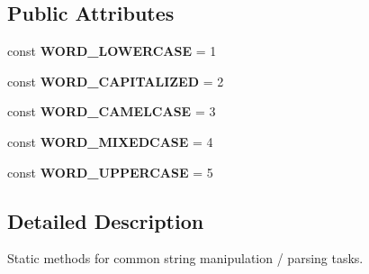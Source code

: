 \subsection*{Public Attributes}
\begin{DoxyCompactItemize}
\item 
\hypertarget{classBabab_1_1Simphplist_1_1String_ac9a5b0f0ab6669f348d8fd4b7872d886}{const {\bfseries W\+O\+R\+D\+\_\+\+L\+O\+W\+E\+R\+C\+A\+S\+E} = 1}\label{classBabab_1_1Simphplist_1_1String_ac9a5b0f0ab6669f348d8fd4b7872d886}

\item 
\hypertarget{classBabab_1_1Simphplist_1_1String_a50cb0d79ad7c99ee26a5671a8c8d5155}{const {\bfseries W\+O\+R\+D\+\_\+\+C\+A\+P\+I\+T\+A\+L\+I\+Z\+E\+D} = 2}\label{classBabab_1_1Simphplist_1_1String_a50cb0d79ad7c99ee26a5671a8c8d5155}

\item 
\hypertarget{classBabab_1_1Simphplist_1_1String_a4ddd0903abb5cb79188a99c22029ff63}{const {\bfseries W\+O\+R\+D\+\_\+\+C\+A\+M\+E\+L\+C\+A\+S\+E} = 3}\label{classBabab_1_1Simphplist_1_1String_a4ddd0903abb5cb79188a99c22029ff63}

\item 
\hypertarget{classBabab_1_1Simphplist_1_1String_adba85d1760b3aea3506448855ec4e923}{const {\bfseries W\+O\+R\+D\+\_\+\+M\+I\+X\+E\+D\+C\+A\+S\+E} = 4}\label{classBabab_1_1Simphplist_1_1String_adba85d1760b3aea3506448855ec4e923}

\item 
\hypertarget{classBabab_1_1Simphplist_1_1String_a44f3604e9470b92f5f7f1128bba98f35}{const {\bfseries W\+O\+R\+D\+\_\+\+U\+P\+P\+E\+R\+C\+A\+S\+E} = 5}\label{classBabab_1_1Simphplist_1_1String_a44f3604e9470b92f5f7f1128bba98f35}

\end{DoxyCompactItemize}


\subsection{Detailed Description}
Static methods for common string manipulation / parsing tasks. 

